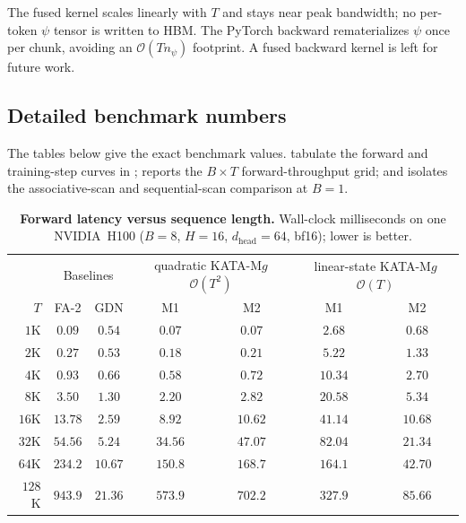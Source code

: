 \documentclass{article}
\newcommand{\1}{\bm{1}}
\def\gO{{\mathcal{O}}}
\newcommand{\seql}{T}
\theoremstyle{definition}
\begin{document}
The fused kernel scales linearly with $\seql$ and stays near peak bandwidth; no per-token $\psi$
tensor is written to HBM. The PyTorch backward rematerializes $\psi$ once per chunk, avoiding an
$\gO(\seql n_\psi)$ footprint. A fused backward kernel is left for future work.

\subsection{Detailed benchmark numbers}
\label{app:bench-numbers}

The tables below give the exact benchmark values. 
tabulate the forward and training-step curves in ;
 reports the $B\times \seql$ forward-throughput grid; and
 isolates the associative-scan and sequential-scan comparison at $B=1$.

\begin{table}[htbp]
    \centering\footnotesize
    \caption{\textbf{Forward latency versus sequence length.}
    Wall-clock milliseconds on one NVIDIA~H100
    ($B{=}8$, $H{=}16$, $d_\text{head}{=}64$, bf16); lower is better.}
    \label{tab:tsweep-fwd}
    \begin{tabular}{r|cc|cc|cc}
    \toprule
    & \multicolumn{2}{c|}{Baselines} & \multicolumn{2}{c|}{quadratic KATA-M$g$ $\gO(\seql^2)$} & \multicolumn{2}{c}{linear-state KATA-M$g$ $\gO(\seql)$} \\
    $\seql$ & FA-2 & GDN & M1 & M2 & M1 & M2 \\
    \midrule
    $1$K   & $0.09$  & $0.54$  & $0.07$  & $0.07$  & $2.68$  & $0.68$  \\
    $2$K   & $0.27$  & $0.53$  & $0.18$  & $0.21$  & $5.22$  & $1.33$  \\
    $4$K   & $0.93$  & $0.66$  & $0.58$  & $0.72$  & $10.34$ & $2.70$  \\
    $8$K   & $3.50$  & $1.30$  & $2.20$  & $2.82$  & $20.58$ & $5.34$  \\
    $16$K  & $13.78$ & $2.59$  & $8.92$  & $10.62$ & $41.14$ & $10.68$ \\
    $32$K  & $54.56$ & $5.24$  & $34.56$ & $47.07$ & $82.04$ & $21.34$ \\
    $64$K  & $234.2$ & $10.67$ & $150.8$ & $168.7$ & $164.1$ & $42.70$ \\
    $128$K & $943.9$ & $21.36$ & $573.9$ & $702.2$ & $327.9$ & $85.66$ \\
    \bottomrule
    \end{tabular}
\end{table}
\end{document}
